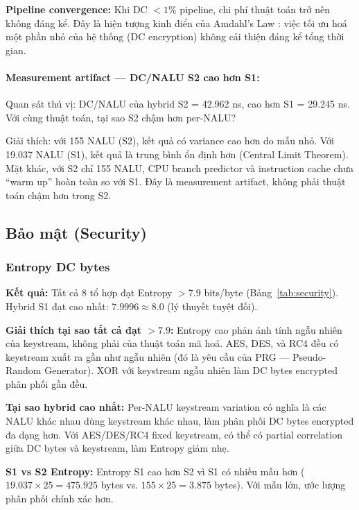 \textbf{Pipeline convergence:} Khi DC $< 1\%$ pipeline, chi phí thuật toán trở nên
không đáng kể. Đây là hiện tượng kinh điển của Amdahl's Law \cite{amdahl1967}:
việc tối ưu hoá một phần nhỏ của hệ thống (DC encryption) không cải thiện
đáng kể tổng thời gian.

\paragraph{Measurement artifact --- DC/NALU S2 cao hơn S1:}

Quan sát thú vị: DC/NALU của hybrid S2 = 42.962 ns, cao hơn S1 = 29.245 ns.
Với cùng thuật toán, tại sao S2 chậm hơn per-NALU?

Giải thích: với 155 NALU (S2), kết quả có variance cao hơn do mẫu nhỏ. Với
19.037 NALU (S1), kết quả là trung bình ổn định hơn (Central Limit Theorem).
Mặt khác, với S2 chỉ 155 NALU, CPU branch predictor và instruction cache
chưa ``warm up'' hoàn toàn so với S1. Đây là measurement artifact, không phải
thuật toán chậm hơn trong S2.

\subsection{Bảo mật (Security)}

\subsubsection{Entropy DC bytes}

\textbf{Kết quả:} Tất cả 8 tổ hợp đạt Entropy $> 7.9$ bits/byte (Bảng~\ref{tab:security}).
Hybrid S1 đạt cao nhất: $7.9996 \approx 8.0$ (lý thuyết tuyệt đối).

\textbf{Giải thích tại sao tất cả đạt $> 7.9$:}
Entropy cao phản ánh tính ngẫu nhiên của keystream, không phải của thuật toán
mã hoá. AES, DES, và RC4 đều có keystream xuất ra gần như ngẫu nhiên (đó là
yêu cầu của PRG --- Pseudo-Random Generator). XOR với keystream ngẫu nhiên
làm DC bytes encrypted phân phối gần đều.

\textbf{Tại sao hybrid cao nhất:}
Per-NALU keystream variation có nghĩa là các NALU khác nhau dùng keystream khác nhau,
làm phân phối DC bytes encrypted đa dạng hơn. Với AES/DES/RC4 fixed keystream,
có thể có partial correlation giữa DC bytes và keystream, làm Entropy giảm nhẹ.

\textbf{S1 vs S2 Entropy:}
Entropy S1 cao hơn S2 vì S1 có nhiều mẫu hơn ($19.037 \times 25 = 475.925$ bytes
vs. $155 \times 25 = 3.875$ bytes). Với mẫu lớn, ước lượng phân phối chính xác hơn.


